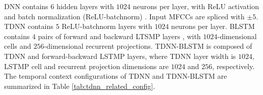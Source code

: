 \documentclass[a4paper]{article}
\begin{document}
DNN contains $6$ hidden layers with $1024$ neurons per layer, with ReLU activation and batch normalization (ReLU-batchnorm) \cite{ioffe2015batch}. Input MFCCs are spliced with $\pm 5$.
TDNN contains $5$ ReLU-batchnorm layers with $1024$ neurons per layer. BLSTM contains $4$ pairs of forward and backward LTSMP layers \cite{sak2014long}, with $1024$-dimensional cells and $256$-dimensional recurrent projections. TDNN-BLSTM is composed of TDNN and forward-backward LSTMP layers, where TDNN layer width is $1024$, LSTMP cell and recurrent projection dimensions are $1024$ and $256$, respectively. The temporal context configurations of TDNN and TDNN-BLSTM are summarized in Table \ref{tab:tdnn_related_config}.
\begin{table}[tbp]
\renewcommand\arraystretch{0.9}
\centering
\caption{Context configurations for TDNN and TDNN-BLSTM}
\label{tab:tdnn_related_config}
\end{table}
\end{document}
